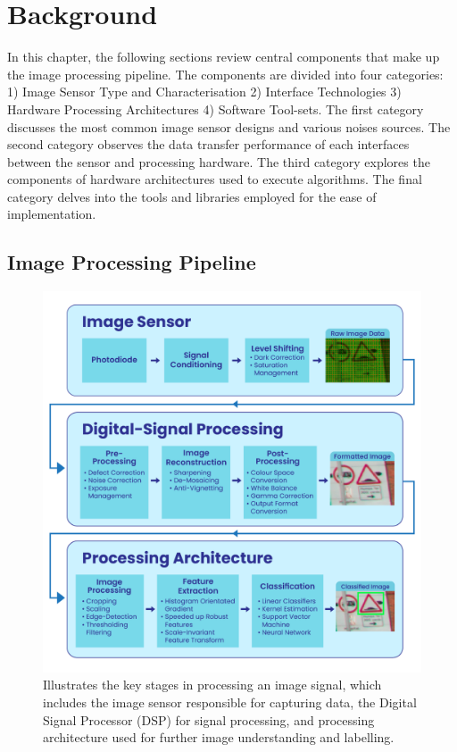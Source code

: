 \chapter{Background}
In this chapter, the following sections review central components that make up the image processing pipeline. The components are divided into four categories: 1) Image Sensor Type and Characterisation 2) Interface Technologies 3) Hardware Processing Architectures 4) Software Tool-sets. The first category discusses the most common image sensor designs and various noises sources. The second category observes the data transfer performance of each interfaces between the sensor and processing hardware. The third category explores the components of hardware architectures used to execute algorithms. The final category delves into the tools and libraries employed for the ease of implementation.

\section{Image Processing Pipeline}
\label{chap:Background}
\begin{figure}[!t]
\centering
\includegraphics[width=\linewidth]{Images/vision_pipeline.png}
\caption[Image-Signal Pipeline]{Illustrates the key stages in processing an image signal, which includes the image sensor responsible for capturing data, the Digital Signal Processor (DSP) for signal processing, and processing architecture used for further image understanding and labelling.}
\label{fig:VisionPipeline}
\end{figure} 
 
